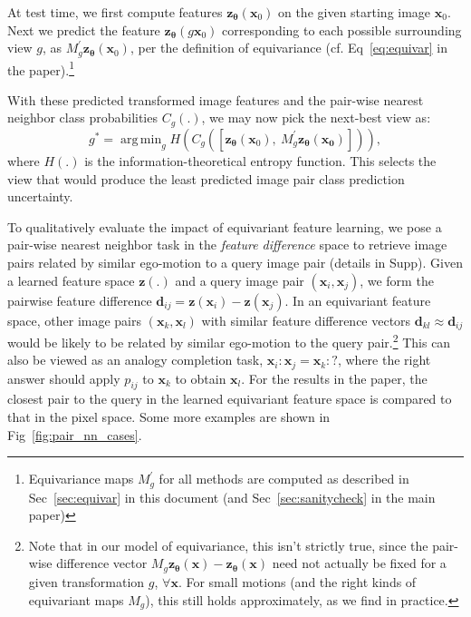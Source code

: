 \documentclass[10pt,twocolumn,letterpaper]{article}
\DeclareMathOperator*{\argmin}{arg\,min}
\newcommand{\cc}{}
\begin{document}
At test time, we first compute features $\mathbf{z}_{\bm{\theta}}(\bm{x}_0)$ on the given starting image $\bm{x}_0$. Next we predict the feature $\mathbf{z}_{\bm{\theta}}(g \bm{x}_0)$ corresponding to each possible surrounding view $g$, as $M_g^\prime \mathbf{z}_{\bm{\theta}}(\bm{x}_0)$, per the definition of equivariance (cf. Eq~\ref{eq:equivar} in the paper).\footnote{Equivariance maps $M_g^\prime$ for all methods are computed as described in Sec~\ref{sec:equivar} in this document (and Sec~\ref{sec:sanitycheck} in the main paper)}%

With these predicted transformed image features and the pair-wise nearest neighbor class probabilities $C_g(.)$, we may now pick the next-best view as:
\begin{equation}
g^*=\argmin_g H(C_g([\mathbf{z}_{\bm{\theta}}(\bm{x}_0),~  M_g^\prime \mathbf{z}_{\bm{\theta}}(\bm{x_0})])),
  \label{eq:nbv}
\end{equation}
where $H(.)$ is the information-theoretical entropy function. This selects the view that would produce the least predicted image pair class prediction uncertainty.

To qualitatively evaluate the impact of equivariant feature learning, we pose a pair-wise nearest neighbor task in the \emph{feature difference} space to retrieve image pairs related by similar ego-motion to a query image pair (details in Supp).
Given a learned feature space $\mathbf{z(.)}$ and a query image pair $(\bm{x}_i,\bm{x}_j)$, we form the pairwise feature difference  $\bm{d}_{ij}=\mathbf{z}(\bm{x}_i)-\mathbf{z}(\bm{x}_j)$.
In an equivariant feature space, other image pairs $(\bm{x}_k,\bm{x}_l)$ with similar feature difference vectors $\bm{d}_{kl}\approx \bm{d}_{ij}$ would be likely to be related by similar ego-motion to the query pair.\footnote{\cc{Note that in our model of equivariance, this isn't strictly true, since the pair-wise difference vector $M_g\mathbf{z_{\bm{\theta}}}(\bm{x})-\mathbf{z_{\bm{\theta}}}(\bm{x})$ need not actually be fixed for a given transformation $g$, $\forall\bm{x}$. For small motions (and the right kinds of equivariant maps $M_g$), this still holds approximately, as we find in practice.}}  This can also be viewed as an analogy completion task, $\bm{x}_i : \bm{x}_j = \bm{x}_k : ?$, where the right answer should apply $p_{ij}$ to $\bm{x}_k$ to obtain $\bm{x}_l$. For the results in the paper, the closest pair to the query in the learned equivariant feature space is compared to that in the pixel space. Some more examples are shown in Fig~\ref{fig:pair_nn_cases}.

\end{document}
